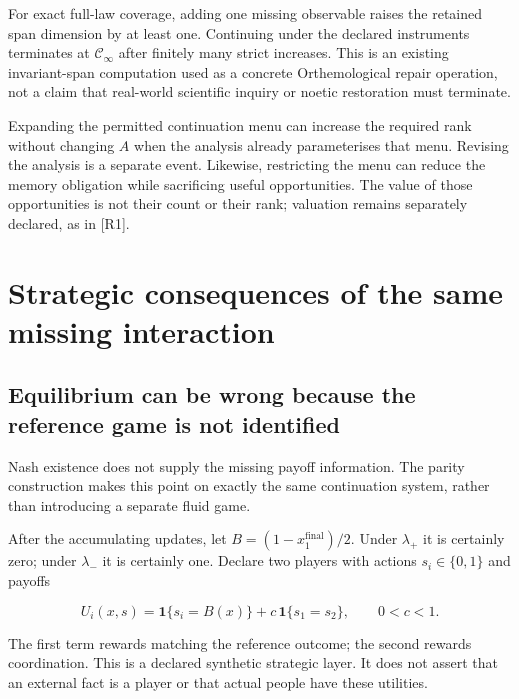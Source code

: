 \documentclass[11pt,a4paper]{article}
\begin{document}
For exact full-law coverage, adding one missing observable raises the
retained span dimension by at least one. Continuing under the declared
instruments terminates at \(\mathscr C_\infty\) after finitely many
strict increases. This is an existing invariant-span computation used as
a concrete Orthemological repair operation, not a claim that real-world
scientific inquiry or noetic restoration must terminate.

Expanding the permitted continuation menu can increase the required rank
without changing \(A\) when the analysis already parameterises that
menu. Revising the analysis is a separate event. Likewise, restricting
the menu can reduce the memory obligation while sacrificing useful
opportunities. The value of those opportunities is not their count or
their rank; valuation remains separately declared, as in {[}R1{]}.

\section{Strategic consequences of the same missing
interaction}\label{strategic-consequences-of-the-same-missing-interaction}

\subsection{Equilibrium can be wrong because the reference game is not
identified}\label{equilibrium-can-be-wrong-because-the-reference-game-is-not-identified}

Nash existence does not supply the missing payoff information. The
parity construction makes this point on exactly the same continuation
system, rather than introducing a separate fluid game.

After the accumulating updates, let \(B=(1-x_1^{\mathrm{final}})/2\).
Under \(\lambda_+\) it is certainly zero; under \(\lambda_-\) it is
certainly one. Declare two players with actions \(s_i\in\{0,1\}\) and
payoffs

\nopagebreak[4]

\[
U_i(x,s)=\mathbf1\{s_i=B(x)\}
       +c\,\mathbf1\{s_1=s_2\},\qquad 0<c<1.
\]

The first term rewards matching the reference outcome; the second
rewards coordination. This is a declared synthetic strategic layer. It
does not assert that an external fact is a player or that actual people
have these utilities.

\end{document}
